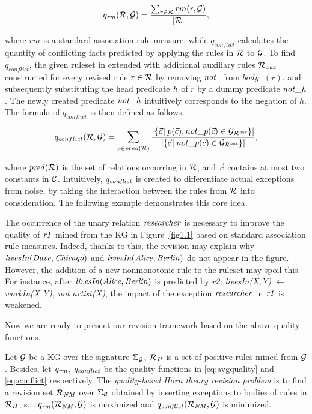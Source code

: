 \begin{equation}
q_{\mathit{rm}}(\mathcal{R},\mathcal{G})=\dfrac{\sum_{r\in \mathcal{R}}rm(r,\mathcal{G})}{|\mathcal{R}|}
\label{eq:avgquality},
\end{equation}

\noindent where $rm$ is a standard association rule measure, while $q_{conflict}$ calculates the quantity of conflicting facts predicted by applying the rules in $\mathcal{R}$ to $\mathcal{G}$. To find $q_{conflict}$, the given ruleset in extended with additional auxiliary rules $\mathcal{R}_{aux}$ constructed for every revised rule $r \in \mathcal{R}$ by removing $\naf$ from $body^-(r)$, and subsequently substituting the head predicate $\mathit{h}$ of $r$ by a dummy predicate $\mathit{not\_h}$. The newly created predicate $\mathit{not\_h}$ intuitively corresponds to the negation of $h$. The formula of $q_{conflict}$ is then defined as follows.

\begin{equation}
q_{conflict}(\mathcal{R},\mathcal{G})=\sum_{p\in pred(\mathcal{R})} \dfrac{|\{ \vec{c}\,|\,p(\vec{c}),not\_p(\vec{c})\in \mathcal{G}_{\mathcal{R}^{\mathit{aux}}}\} |}{|\{ \vec{c}\,|\,not\_p(\vec{c})\in \mathcal{G}_{\mathcal{R}^{\mathit{aux}}}\} |}
\label{eq:conflict},
\end{equation}

\noindent where $\mathit{pred(\mathcal{R})}$ is the set of relations occurring in $\mathcal{R}$, and $\vec{c}$ contains at most two constants in $\mathcal{C}$. Intuitively, $q_{\mathit{conflict}}$ is created to differentiate actual exceptions from noise, by taking the interaction between the rules from $\mathcal{R}$ into consideration. The following example demonstrates this core idea.

\begin{example}

The occurrence of the unary relation $\mathit{researcher}$ is necessary to improve the quality of $\mathit{r1}$ mined from the KG in Figure~\ref{fig1.1} based on standard association rule measures. Indeed, thanks to this, the revision may explain why $\mathit{livesIn(Dave,Chicago)}$ and $\mathit{livesIn(Alice,Berlin)}$ do not appear in the figure. However, the addition of a new nonmonotonic rule to the ruleset may spoil this. For instance, after $\mathit{livesIn(Alice,Berlin)}$ is predicted by \textit{r2: livesIn(X,Y) $\leftarrow$ workIn(X,Y), not artist(X)}, the impact of the exception $\mathit{researcher}$ in $\mathit{r1}$ is weakened.
\end{example}

Now we are ready to present our revision framework based on the above quality functions.

\begin{definition} \label{def:qhtr}
Let $\mathcal{G}$ be a KG over the signature $\Sigma_{\mathcal{G}}$, $\mathcal{R}_{\mathit{H}}$ is a set of positive rules mined from $\mathcal{G}$. Besides, let $\mathit{q_{rm}}$, $\mathit{q_{conflict}}$ be the quality functions in \ref{eq:avgquality} and \ref{eq:conflict} respectively. The \emph{quality-based Horn theory revision problem} is to find a revision set $\mathcal{R}_{\mathit{NM}}$ over $\Sigma_{\mathcal{G}}$ obtained by inserting exceptions to bodies of rules in $\mathcal{R}_{\mathit{H}}$, s.t. $q_{\mathit{rm}}(\mathcal{R}_{\mathit{NM}},\mathcal{G})$ is maximized and $q_{\mathit{conflict}}(\mathcal{R}_{\mathit{NM}},\mathcal{G})$ is minimized.
\end{definition}

